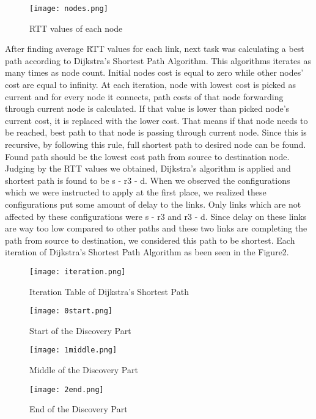 \documentclass[conference]{IEEEtran}
\begin{document}
\begin{figure}[htbp]
\centerline{\texttt{[image: nodes.png]}}
\caption{RTT values of each node}
\label{fig1}
\end{figure}

After finding average RTT values for each link, next task was calculating a best path according to Dijkstra's Shortest Path Algorithm. This algorithms iterates as many times as node count. Initial nodes cost is equal to zero while other nodes' cost are equal to infinity. At each iteration, node with lowest cost is picked as current and for every node it connects, path costs of that node forwarding through current node is calculated. If that value is lower than picked node's current cost, it is replaced with the lower cost. That means if that node needs to be reached, best path to that node is passing through current node. Since this is recursive, by following this rule, full shortest path to desired node can be found. Found path should be the lowest cost path from source to destination node. Judging by the RTT values we obtained, Dijkstra's algorithm is applied and shortest path is found to be s - r3 - d. When we observed the configurations which we were instructed to apply at the first place, we realized these configurations put some amount of delay to the links. Only links which are not affected by these configurations were s - r3 and r3 - d. Since delay on these links are way too low compared to other paths and these two links are completing the path from source to destination, we considered this path to be shortest. Each iteration of Dijkstra's Shortest Path Algorithm as been seen in the Figure2.
\begin{figure}[htbp]
\centerline{\texttt{[image: iteration.png]}}
\caption{Iteration Table of Dijkstra's Shortest Path}
\label{fig2}
\end{figure}

\begin{figure}[htbp]
\centerline{\texttt{[image: 0start.png]}}
\caption{Start of the Discovery Part}
\label{fig3}
\end{figure}

\begin{figure}[htbp]
\centerline{\texttt{[image: 1middle.png]}}
\caption{Middle of the Discovery Part}
\label{fig4}
\end{figure}

\begin{figure}[htbp]
\centerline{\texttt{[image: 2end.png]}}
\caption{End of the Discovery Part}
\label{fig5}
\end{figure}
\end{document}
